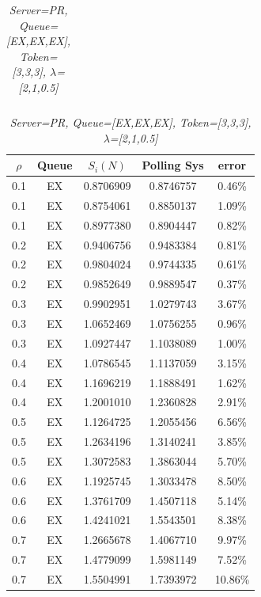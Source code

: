\documentclass[12pt,a4paper,italian]{article}
\begin{document}
\begin{table}[ht!]
\begin{minipage}[b]{0.48\linewidth}
\begin{tabular}{c c c c c}
		\end{tabular}
	\end{minipage}
	\hspace{0.5cm}
	\begin{minipage}[b]{0.48\linewidth}
		\centering
		\caption{\scriptsize \emph{Server=PR, Queue=[EX,EX,EX], Token=[3,3,3], $\lambda$=[2,1,0.5]}}
		\label{tab10}
		\tiny
		\begin{tabular}{c c c c c}
			\hline
			$\rho$ & Queue & $S_i(N)$ & Polling Sys & error \\ \hline
			 0.1 & EX & 0.8706909 &   0.8746757    & 0.46\%  \\
			 0.1 & EX & 0.8754061 &   0.8850137    & 1.09\%  \\
			 0.1 & EX & 0.8977380 &   0.8904447    & 0.82\%  \\ \hline \hline
			 0.2 & EX & 0.9406756 &   0.9483384    & 0.81\%  \\
			 0.2 & EX & 0.9804024 &   0.9744335    & 0.61\%  \\
			 0.2 & EX & 0.9852649 &   0.9889547    & 0.37\%  \\ \hline \hline
			 0.3 & EX & 0.9902951 &   1.0279743    & 3.67\%  \\
			 0.3 & EX & 1.0652469 &   1.0756255    & 0.96\%  \\
			 0.3 & EX & 1.0927447 &   1.1038089    & 1.00\%  \\ \hline \hline
			 0.4 & EX & 1.0786545 &   1.1137059    & 3.15\%  \\
			 0.4 & EX & 1.1696219 &   1.1888491    & 1.62\%  \\
			 0.4 & EX & 1.2001010 &   1.2360828    & 2.91\%  \\ \hline \hline
			 0.5 & EX & 1.1264725 &   1.2055456    & 6.56\%  \\
			 0.5 & EX & 1.2634196 &   1.3140241    & 3.85\%  \\
			 0.5 & EX & 1.3072583 &   1.3863044    & 5.70\%  \\ \hline \hline
			 0.6 & EX & 1.1925745 &   1.3033478    & 8.50\%  \\
			 0.6 & EX & 1.3761709 &   1.4507118    & 5.14\%  \\
			 0.6 & EX & 1.4241021 &   1.5543501    & 8.38\%  \\ \hline \hline
			 0.7 & EX & 1.2665678 &   1.4067710    & 9.97\%  \\
			 0.7 & EX & 1.4779099 &   1.5981149    & 7.52\%  \\
			 0.7 & EX & 1.5504991 &   1.7393972    & 10.86\% \\ \hline \hline

\end{tabular}
\end{minipage}
\end{table}
\end{document}
